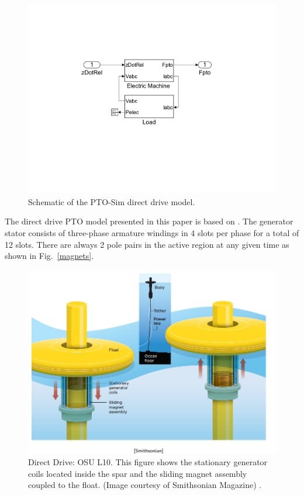 \documentclass[twocolumn,10pt]{asme2e}
\begin{document}
\begin{figure}[t]
    \centering
    \includegraphics[width=1\columnwidth]{Images/DirectDriveSimulink}
    \caption{Schematic of the PTO-Sim direct drive model.}
    \label{DD}
    \end{figure}

The direct drive PTO model presented in this paper is based on \cite{prudell2009novel}. The generator stator consists of three-phase armature windings in 4 slots per phase for a total of 12 slots. There are always 2 pole pairs in the active region at any given time as shown in Fig.~\ref{magnets}.   

\begin{figure}[t]
    \centering
    \includegraphics[width=1\columnwidth]{Images/PAWECSmithsonian}
    \caption{Direct Drive: OSU L10. This figure shows the stationary generator coils located inside the spar and the sliding magnet assembly coupled to the float.  (Image courtesy of Smithsonian Magazine) \cite{Rusch:2009aa}.} 
    \label{L10}
    \end{figure}
\end{document}
